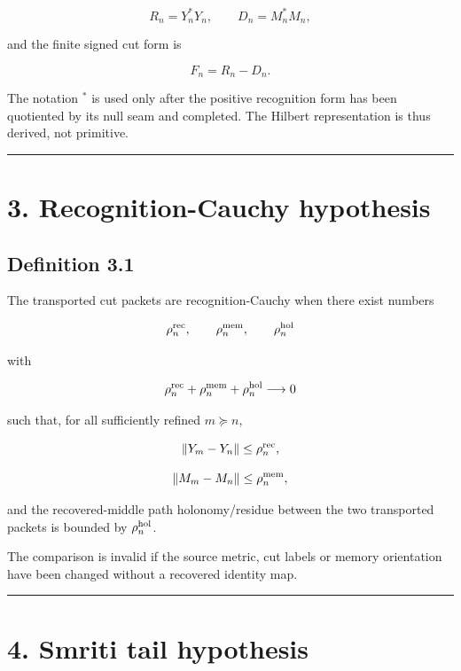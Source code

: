 \[
R_n=Y_n^*Y_n,
\qquad
D_n=M_n^*M_n,
\]

and the finite signed cut form is

\[
F_n=R_n-D_n.
\]

The notation \(^*\) is used only after the positive recognition form has been
quotiented by its null seam and completed. The Hilbert representation is thus
derived, not primitive.

\begin{center}\rule{0.5\linewidth}{0.5pt}\end{center}

\hypertarget{recognition-cauchy-hypothesis}{%
\section{3. Recognition-Cauchy hypothesis}\label{recognition-cauchy-hypothesis}}

\hypertarget{definition-3.1}{%
\subsection{Definition 3.1}\label{definition-3.1}}

The transported cut packets are recognition-Cauchy when there exist numbers

\[
\rho_n^{\rm rec},
\qquad
\rho_n^{\rm mem},
\qquad
\rho_n^{\rm hol}
\]

with

\[
\rho_n^{\rm rec}+\rho_n^{\rm mem}+\rho_n^{\rm hol}
\longrightarrow0
\]

such that, for all sufficiently refined \(m\succeq n\),

\[
\|Y_m-Y_n\|
\le \rho_n^{\rm rec},
\]

\[
\|M_m-M_n\|
\le \rho_n^{\rm mem},
\]

and the recovered-middle path holonomy/residue between the two transported
packets is bounded by \(\rho_n^{\rm hol}\).

The comparison is invalid if the source metric, cut labels or memory orientation
have been changed without a recovered identity map.

\begin{center}\rule{0.5\linewidth}{0.5pt}\end{center}

\hypertarget{smriti-tail-hypothesis}{%
\section{4. Smriti tail hypothesis}\label{smriti-tail-hypothesis}}

